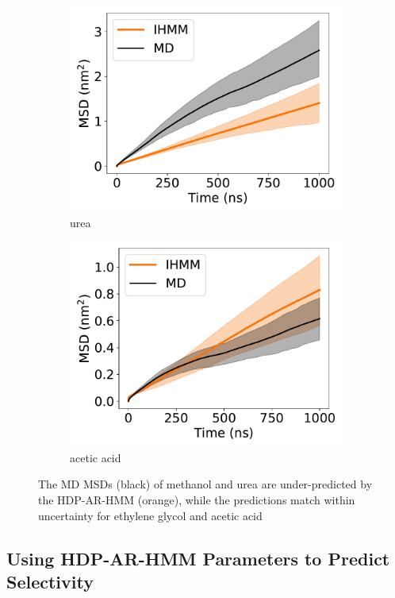 \documentclass[journal=jpcbfk,manuscript=article]{achemso}
\begin{document}
\begin{figure}
\begin{subfigure}{0.24\textwidth}
  \includegraphics[width=\textwidth]{unclustered_msd_URE.pdf}
  \caption{urea}\label{fig:unclustered_msd_URE}
  \end{subfigure}
  \begin{subfigure}{0.24\textwidth}
  \includegraphics[width=\textwidth]{unclustered_msd_ACH.pdf}
  \caption{acetic acid}\label{fig:unclustered_msd_ACH}
  \end{subfigure}
  \caption{The MD MSDs (black) of methanol and urea are under-predicted by 
  the HDP-AR-HMM (orange), while the predictions match within uncertainty for ethylene
  glycol and acetic acid}\label{fig:unclustered_msds}
  \end{figure}
  
  \subsection{Using HDP-AR-HMM Parameters to Predict Selectivity}\label{section:macroscopic_properties}
  
\end{document}
